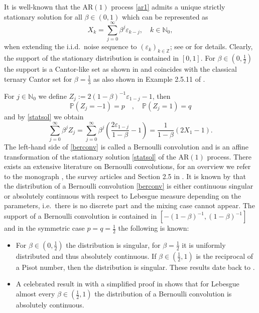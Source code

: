 \documentclass[12pt]{amsart}
\theoremstyle{definition}
\theoremstyle{remark}
\newcommand{\ganz}{{\mathbb Z}}
\newcommand{\nat}{{\mathbb N}}
\newcommand{\AR}{\operatorname{AR(1)}}
\newcommand{\eps}{{\varepsilon}}
\newcommand{\Pm}{{\mathbb P}}
\numberwithin{equation}{section}
\begin{document}
It is well-known that the $\AR$ process \eqref{ar1} admits a unique strictly stationary solution for all $\beta\in(0,1)$ which can be represented as 
\begin{equation}\label{statsol}
X_{k}=\sum_{j=0}^{\infty}\beta^{j}\eps_{k-j},\quad k\in\nat_{0},
\end{equation}
when extending the i.i.d.\ noise sequence to $(\eps_{k})_{k\in\ganz}$; see \cite{BroDav} or \cite{GolMal} for details. 
Clearly, the support of the stationary distribution is contained in $[0,1]$. For $\beta\in(0,\frac12)$ the support is a Cantor-like set as shown in \cite{Sterk} and coincides with the classical ternary Cantor set for $\beta=\frac13$ as also shown in Example 2.5.11 of \cite{BDM}.

For $j\in\nat_{0}$ we define $Z_{j}:=2(1-\beta)^{-1}\eps_{1-j}-1$, then
$$\Pm(Z_{j}=-1)=p\quad , \quad \Pm(Z_{j}=1)=q$$
and by \eqref{statsol} we obtain
\begin{equation}\label{berconv}
\sum_{j=0}^{\infty}\beta^{j}Z_{j}=\sum_{j=0}^{\infty}\beta^{j}\left(\frac{2\eps_{1-j}}{1-\beta}-1\right)=\frac1{1-\beta}(2X_{1}-1).
\end{equation}
The left-hand side of \eqref{berconv} is called a Bernoulli convolution and is an affine transformation of the stationary solution \eqref{statsol} of the $\AR$ process. There exists an extensive literature on Bernoulli convolutions, for an overview we refer to the monograph \cite{BSS}, the survey articles \cite{PSS, Varju} and Section 2.5 in \cite{DiaFre}. It is known by \cite{JesWin} that the distribution of a Bernoulli convolution \eqref{berconv} is either continuous singular or absolutely continuous with respect to Lebesgue measure depending on the parameters, i.e.\ there is no discrete part and the mixing case cannot appear. The support of a Bernoulli convolution is contained in $[-(1-\beta)^{-1},(1-\beta)^{-1}]$ and in the symmetric case $p=q=\frac12$ the following is known:
\begin{itemize}
\item For $\beta\in(0,\frac12)$ the distribution is singular, for $\beta=\frac12$ it is uniformly distributed and thus absolutely continuous. If $\beta\in(\frac12,1)$
is the reciprocal of a Pisot number, then the distribution is singular. These results date back to \cite{KerWin,Erdoes}.
\item A celebrated result in \cite{Sol1} with a simplified proof in \cite{PerSol1} shows that for Lebesgue almost every $\beta\in(\frac12,1)$ the distribution of a Bernoulli convolution is absolutely continuous.
\end{itemize}
\end{document}
